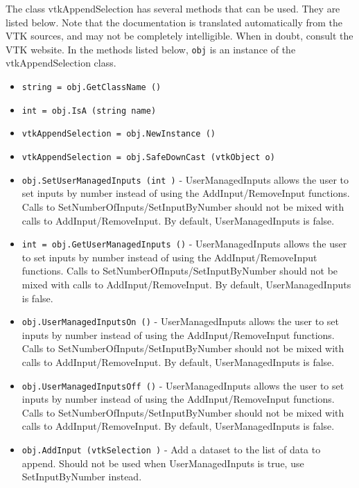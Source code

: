 The class vtkAppendSelection has several methods that can be used.
  They are listed below.
Note that the documentation is translated automatically from the VTK sources,
and may not be completely intelligible.  When in doubt, consult the VTK website.
In the methods listed below, \verb|obj| is an instance of the vtkAppendSelection class.
\begin{itemize}
\item  \verb|string = obj.GetClassName ()|

\item  \verb|int = obj.IsA (string name)|

\item  \verb|vtkAppendSelection = obj.NewInstance ()|

\item  \verb|vtkAppendSelection = obj.SafeDownCast (vtkObject o)|

\item  \verb|obj.SetUserManagedInputs (int )| -  UserManagedInputs allows the user to set inputs by number instead of
 using the AddInput/RemoveInput functions. Calls to
 SetNumberOfInputs/SetInputByNumber should not be mixed with calls
 to AddInput/RemoveInput. By default, UserManagedInputs is false.

\item  \verb|int = obj.GetUserManagedInputs ()| -  UserManagedInputs allows the user to set inputs by number instead of
 using the AddInput/RemoveInput functions. Calls to
 SetNumberOfInputs/SetInputByNumber should not be mixed with calls
 to AddInput/RemoveInput. By default, UserManagedInputs is false.

\item  \verb|obj.UserManagedInputsOn ()| -  UserManagedInputs allows the user to set inputs by number instead of
 using the AddInput/RemoveInput functions. Calls to
 SetNumberOfInputs/SetInputByNumber should not be mixed with calls
 to AddInput/RemoveInput. By default, UserManagedInputs is false.

\item  \verb|obj.UserManagedInputsOff ()| -  UserManagedInputs allows the user to set inputs by number instead of
 using the AddInput/RemoveInput functions. Calls to
 SetNumberOfInputs/SetInputByNumber should not be mixed with calls
 to AddInput/RemoveInput. By default, UserManagedInputs is false.

\item  \verb|obj.AddInput (vtkSelection )| -  Add a dataset to the list of data to append. Should not be
 used when UserManagedInputs is true, use SetInputByNumber instead.


\end{itemize}

